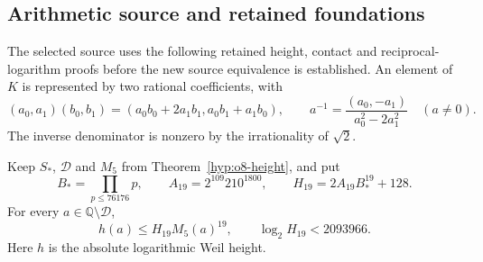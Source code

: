 \subsection{Arithmetic source and retained foundations}
\label{subsec:quartic-source}
The selected source uses the following retained height, contact and
reciprocal-logarithm proofs before the new source equivalence is established.
An element of $K$ is represented by two rational coefficients, with
\[
 (a_0,a_1)(b_0,b_1)=(a_0b_0+2a_1b_1,a_0b_1+a_1b_0),\qquad
 a^{-1}=\frac{(a_0,-a_1)}{a_0^2-2a_1^2}\quad(a\ne0).
\]
The inverse denominator is nonzero by the irrationality of $\sqrt2$.

\begin{theorem}\label{thm:quartic-height19}
Keep $S_*$, $\mathcal D$ and $M_5$ from Theorem~\ref{hyp:o8-height}, and put
\[
 B_*=\prod_{p\le76176}p,\qquad
 A_{19}=2^{109}210^{1800},\qquad H_{19}=2A_{19}B_*^{19}+128.
\]
For every $a\in\mathbb Q\setminus\mathcal D$,
\[
 h(a)\le H_{19}M_5(a)^{19},
 \qquad \log_2H_{19}<2093966.
\]
Here $h$ is the absolute logarithmic Weil height.
\end{theorem}
